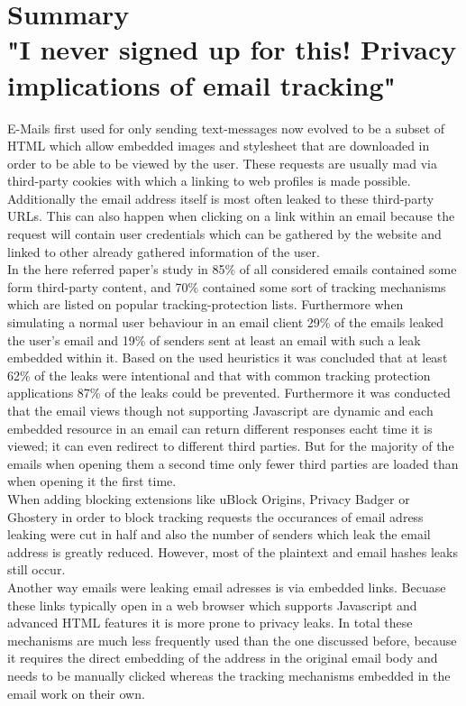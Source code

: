 \documentclass{report}
\begin{document}
	
	\section{Summary \cite{EMailPrivacy} \\ "I never signed up for this! Privacy
implications of email tracking"}
	\startsection
		E-Mails first used for only sending text-messages now evolved to be a subset of HTML which allow embedded images and stylesheet that are downloaded in order to be able to be viewed by the user. These requests are usually mad via third-party cookies with which a linking to web profiles is made possible. Additionally the email address itself is most often leaked to these third-party URLs. This can also happen when clicking on a link within an email because the request will contain user credentials which can be gathered by the website and linked to other already gathered information of the user. \\
		In the here referred paper's study in 85\% of all considered emails contained some form third-party content, and 70\% contained some sort of tracking mechanisms which are listed on popular tracking-protection lists. Furthermore when simulating a normal user behaviour in an email client 29\% of the emails leaked the user's email and 19\% of senders sent at least an email with such a leak embedded within it. Based on the used heuristics it was concluded that at least 62\% of the leaks were intentional and that with common tracking protection applications 87\% of the leaks could be prevented. Furthermore it was conducted that the email views though not supporting Javascript are dynamic and each embedded resource in an email can return different responses eacht time it is viewed; it can even redirect to different third parties. But for the majority of the emails when opening them a second time only fewer third parties are loaded than when opening it the first time. \\
		When adding blocking extensions like uBlock Origins, Privacy Badger or Ghostery in order to block tracking requests the occurances of email adress leaking were cut in half and also the number of senders which leak the email address is greatly reduced. However, most of the plaintext and email hashes leaks still occur. \\
		Another way emails were leaking email adresses is via embedded links. Becuase these links typically open in a web browser which supports Javascript and advanced HTML features it is more prone to privacy leaks. In total these mechanisms are much less frequently used than the one discussed before, because it requires the direct embedding of the address in the original email body and needs to be manually clicked whereas the tracking mechanisms embedded in the email work on their own. \\
\end{document}
